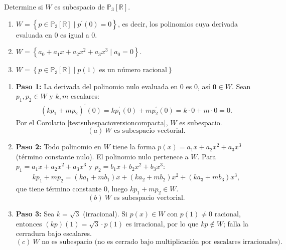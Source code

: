 \begin{example}
Determine si $W$ es subespacio de $\mathbb{P}_{3}\left[\mathbb{R}\right].$
\begin{enumerate}[$(a)$]
\item $W=\left\lbrace p \in \mathbb{P}_{3}\left[\mathbb{R}\right]  \mid p^{\prime}(0)=0  \right\rbrace$, es decir, los polinomios cuya derivada evaluada en $0$ es igual a $0.$
\item $W=\left\lbrace a_0+a_1 x+ a_2 x^2+ a_3 x^3  \mid a_0=0   \right\rbrace.$
\item $W=\left\lbrace p \in \mathbb{P}_{3}\left[\mathbb{R}\right]  \mid p(1) \text{ es un número racional}  \right\rbrace$
\end{enumerate}
\begin{myproof}
\begin{enumerate}[$(a)$]
\item \textbf{Paso 1:} La derivada del polinomio nulo evaluada en $0$ es $0$, así $\mathbf{0}\in W$. Sean $p_1,p_2\in W$ y $k,m$ escalares:
\begin{align*}
\left(kp_1+mp_2\right)^{\prime}(0)=kp_1^{\prime}(0)+mp_2^{\prime}(0)=k\cdot 0+m\cdot 0=0.
\end{align*}
Por el Corolario \ref{testsubespacioversioncompacta}, $W$ es subespacio.
$$\boxed{(a)\ W \text{ es subespacio vectorial.}}$$

\item \textbf{Paso 2:} Todo polinomio en $W$ tiene la forma $p(x)=a_1x+a_2x^2+a_3x^3$ (término constante nulo). El polinomio nulo pertenece a $W$. Para $p_1=a_1x+a_2x^2+a_3x^3$ y $p_2=b_1x+b_2x^2+b_3x^3$:
\begin{align*}
kp_1+mp_2=(ka_1+mb_1)x+(ka_2+mb_2)x^2+(ka_3+mb_3)x^3,
\end{align*}
que tiene término constante $0$, luego $kp_1+mp_2\in W$.
$$\boxed{(b)\ W \text{ es subespacio vectorial.}}$$

\item \textbf{Paso 3:} Sea $k=\sqrt{3}$ (irracional). Si $p(x)\in W$ con $p(1)\neq 0$ racional, entonces $(kp)(1)=\sqrt{3}\cdot p(1)$ es irracional, por lo que $kp\notin W$; falla la cerradura bajo escalares.
$$\boxed{(c)\ W \text{ no es subespacio (no es cerrado bajo multiplicación por escalares irracionales).}}$$
\end{enumerate}
\end{myproof}
\end{example}


